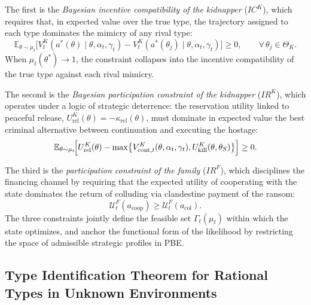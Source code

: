 \documentclass[ecta,nameyear,draft]{econsocart}
\theoremstyle{plain}
\theoremstyle{definition}
\newcommand{\E}{\mathbb{E}}
\newcommand{\ThetaK}{\Theta_K}
\newcommand{\1}{\mathbf{1}}
\begin{document}
The first is the \emph{Bayesian incentive compatibility of the kidnapper} ($IC^K$), which requires that, in expected value over the true type, the trajectory assigned to each type dominates the mimicry of any rival type:
\begin{equation}
\E_{\theta\sim\mu_t}\!\bigl[V^K_t(a^\ast(\theta)\mid\theta,\alpha_t,\gamma_t)-V^K_t(a^\ast(\theta_j)\mid\theta,\alpha_t,\gamma_t)\bigr]\ge 0,\qquad\forall\,\theta_j\in\ThetaK.
\label{eq:ic-kidnapper}
\end{equation}
When $\mu_t(\theta^\ast)\to 1$, the constraint collapses into the incentive compatibility of the true type against each rival mimicry.

The second is the \emph{Bayesian participation constraint of the kidnapper} ($IR^K$), which operates under a logic of strategic deterrence: the reservation utility linked to peaceful release, $U^K_{\mathrm{rel}}(\theta)=-\kappa_{\mathrm{rel}}(\theta)$, must dominate in expected value the best criminal alternative between continuation and executing the hostage:
\begin{equation}
\E_{\theta\sim\mu_t}\!\Bigl[U^K_{\mathrm{rel}}(\theta)-\max\bigl\{V^K_{\mathrm{cont},t}(\theta,\alpha_t,\gamma_t),U^K_{\mathrm{kill}}(\theta,\theta_S)\bigr\}\Bigr]\ge 0.
\label{eq:ir-K}
\end{equation}

The third is the \emph{participation constraint of the family} ($IR^F$), which disciplines the financing channel by requiring that the expected utility of cooperating with the state dominates the return of colluding via clandestine payment of the ransom:
\begin{equation}
\mathcal{U}^F_t(a_{\mathrm{coop}})\ge\mathcal{U}^F_t(a_{\mathrm{col}}).
\label{eq:ir-family}
\end{equation}
The three constraints jointly define the feasible set $\Gamma_t(\mu_t)$ within which the state optimizes, and anchor the functional form of the likelihood by restricting the space of admissible strategic profiles in PBE.

\subsection{Type Identification Theorem for Rational Types in Unknown Environments}\label{subsec:formal-defs}
\end{document}
